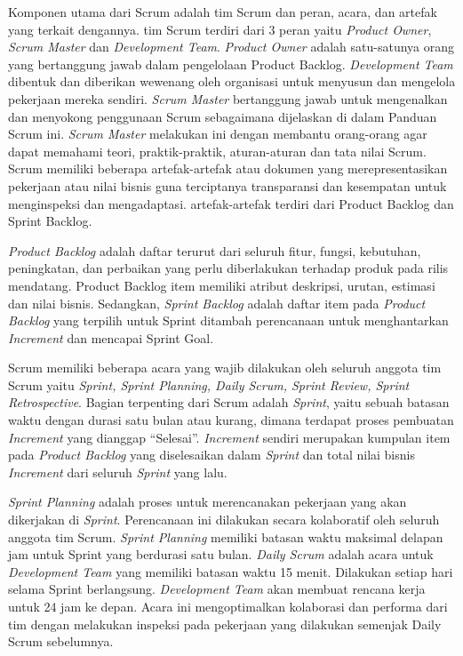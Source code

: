 \par Komponen utama dari Scrum adalah tim Scrum dan peran, acara, dan artefak yang terkait dengannya. tim Scrum terdiri dari 3 peran yaitu \textit{Product Owner}, \textit{Scrum Master} dan \textit{Development Team}. \textit{Product Owner} adalah satu-satunya orang yang bertanggung jawab dalam pengelolaan Product Backlog. \textit{Development Team} dibentuk dan diberikan wewenang oleh organisasi untuk menyusun dan mengelola pekerjaan mereka sendiri. \textit{Scrum Master} bertanggung jawab untuk mengenalkan dan menyokong penggunaan Scrum sebagaimana dijelaskan di dalam Panduan Scrum ini. \textit{Scrum Master} melakukan ini dengan membantu orang-orang agar dapat memahami teori, praktik-praktik, aturan-aturan dan tata nilai Scrum. Scrum memiliki beberapa artefak-artefak atau dokumen yang merepresentasikan pekerjaan atau nilai bisnis guna terciptanya transparansi dan kesempatan untuk menginspeksi dan mengadaptasi. artefak-artefak terdiri dari Product Backlog dan Sprint Backlog.

\par \textit{Product Backlog} adalah daftar terurut dari seluruh fitur, fungsi, kebutuhan, peningkatan, dan perbaikan yang perlu diberlakukan terhadap produk pada rilis mendatang. Product Backlog item memiliki atribut deskripsi, urutan, estimasi dan nilai bisnis. Sedangkan, \textit{Sprint Backlog} adalah daftar item pada \textit{Product Backlog} yang terpilih untuk Sprint ditambah perencanaan untuk menghantarkan \textit{Increment} dan mencapai Sprint Goal. 

\par Scrum memiliki beberapa acara yang wajib dilakukan oleh seluruh anggota tim Scrum yaitu \textit{Sprint, Sprint Planning, Daily Scrum, Sprint Review, Sprint Retrospective}. Bagian terpenting dari Scrum adalah \textit{Sprint}, yaitu sebuah batasan waktu dengan durasi satu bulan atau kurang, dimana terdapat proses pembuatan \textit{Increment} yang dianggap “Selesai”. \textit{Increment} sendiri merupakan kumpulan item pada \textit{Product Backlog} yang diselesaikan dalam \textit{Sprint} dan total nilai bisnis \textit{Increment} dari seluruh \textit{Sprint} yang lalu.

\par \textit{Sprint Planning} adalah proses untuk merencanakan pekerjaan yang akan dikerjakan di \textit{Sprint}. Perencanaan ini dilakukan secara kolaboratif oleh seluruh anggota tim Scrum. \textit{Sprint Planning} memiliki batasan waktu maksimal delapan jam untuk Sprint yang berdurasi satu
bulan. \textit{Daily Scrum} adalah acara untuk \textit{Development Team} yang memiliki batasan waktu 15 menit. Dilakukan setiap hari selama Sprint berlangsung. \textit{Development Team} akan membuat rencana kerja untuk 24 jam ke depan. Acara ini mengoptimalkan kolaborasi dan performa dari tim dengan melakukan inspeksi pada pekerjaan yang dilakukan semenjak Daily Scrum sebelumnya.

